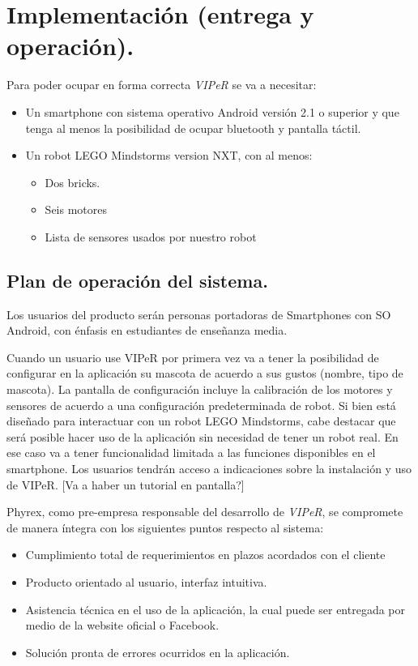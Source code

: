 \chapter{Implementaci\'on (entrega y operaci\'on).}
\newpage
Para poder ocupar en forma correcta \emph{VIPeR} se va a necesitar:
\begin{itemize}
\item Un smartphone con sistema operativo Android versi\'on 2.1 o superior y que tenga al menos la posibilidad de ocupar bluetooth y pantalla t\'actil.
\item Un robot LEGO Mindstorms version NXT, con al menos:
  \begin{itemize}
  \item Dos bricks. 
  \item Seis motores
  \item Lista de sensores usados por nuestro robot
  \end{itemize}
\end{itemize}

\section{Plan de operaci\'on del sistema.}
Los usuarios del producto ser\'an personas portadoras de Smartphones con SO Android, con \'enfasis en estudiantes de ense\~nanza media. 

Cuando un usuario use VIPeR por primera vez va a tener la posibilidad de configurar en la aplicaci\'on su mascota de acuerdo a sus gustos (nombre, tipo de mascota). La pantalla de configuraci\'on incluye la calibraci\'on de los motores y sensores de acuerdo a una configuraci\'on predeterminada de robot. Si bien est\'a dise\~nado para interactuar con un robot LEGO Mindstorms, cabe destacar que ser\'a posible hacer uso de la aplicaci\'on sin necesidad de tener un robot real. En ese caso va a tener funcionalidad limitada a las funciones disponibles en el smartphone. Los usuarios tendr\'an acceso a indicaciones sobre la instalaci\'on y uso de VIPeR. [Va a haber un tutorial en pantalla?]

Phyrex, como pre-empresa responsable del desarrollo de \emph{VIPeR}, se compromete de manera \'integra con los siguientes puntos respecto al sistema:
\begin{itemize}
\item Cumplimiento total de requerimientos en plazos acordados con el cliente
\item Producto orientado al usuario, interfaz intuitiva.
\item Asistencia t\'ecnica en el uso de la aplicaci\'on, la cual puede ser entregada por medio de la website oficial o Facebook.
\item Soluci\'on pronta de errores ocurridos en la aplicaci\'on.
\end{itemize}
\newpage
